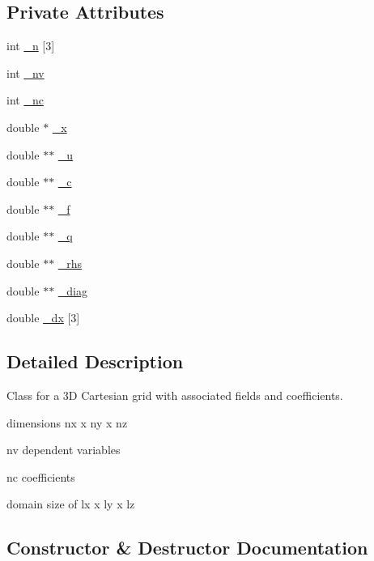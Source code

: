 \subsection*{Private Attributes}
\begin{DoxyCompactItemize}
\item 
int \hyperlink{class_grid_a41b2d78ec79a5e02aca5ae5d7211015f}{\+\_\+n} \mbox{[}3\mbox{]}
\item 
int \hyperlink{class_grid_a544a46153d54c24eb7b1a54a5e49ef04}{\+\_\+nv}
\item 
int \hyperlink{class_grid_a479b4a8777c7f8715345b1c60cf55786}{\+\_\+nc}
\item 
double $\ast$ \hyperlink{class_grid_ad1c8bee84202faab01651a41ff338368}{\+\_\+x}
\item 
double $\ast$$\ast$ \hyperlink{class_grid_a2c97df8d4d7dff67919203615bcf4cdf}{\+\_\+u}
\item 
double $\ast$$\ast$ \hyperlink{class_grid_aa4c430971c64d8181e721b9d9a495ae5}{\+\_\+c}
\item 
double $\ast$$\ast$ \hyperlink{class_grid_a5a7d695ace939b99ed0a3490ce6d80b1}{\+\_\+f}
\item 
double $\ast$$\ast$ \hyperlink{class_grid_af72acfe0e5317f83511031b9087cf2d7}{\+\_\+q}
\item 
double $\ast$$\ast$ \hyperlink{class_grid_ad94a4098427b717c50108c49d4caa048}{\+\_\+rhs}
\item 
double $\ast$$\ast$ \hyperlink{class_grid_a8476f98ceb01a28eed949abfc1123478}{\+\_\+diag}
\item 
double \hyperlink{class_grid_a34b81976f4c80eb2641224886bb6a339}{\+\_\+dx} \mbox{[}3\mbox{]}
\end{DoxyCompactItemize}


\subsection{Detailed Description}
Class for a 3D Cartesian grid with associated fields and coefficients. 


\begin{DoxyItemize}
\item dimensions nx x ny x nz
\item nv dependent variables
\item nc coefficients
\item domain size of lx x ly x lz 
\end{DoxyItemize}

\subsection{Constructor \& Destructor Documentation}
